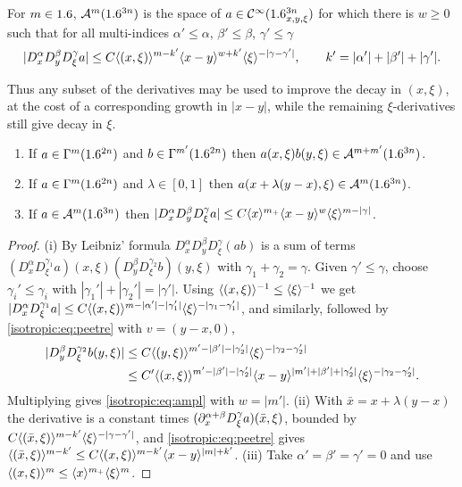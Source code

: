 \begin{definition}\label{isotropic:def:ampl}
For $m\in1.6$, $\mathcal{A}^{m}(1.6^{3n})$ is the space of $a\in\mathcal{C}^\infty(1.6^{3n}_{x,y,\xi})$
for which there is $w\ge0$ such that for all multi-indices
$\alpha'\le\alpha$, $\beta'\le\beta$, $\gamma'\le\gamma$
\begin{equation}\label{isotropic:eq:ampl}
  |D_x^\alpha D_y^\beta D_\xi^\gamma a|\le
  C\langle (x,\xi)\rangle^{m-k'}\langle x-y\rangle^{w+k'}\langle \xi\rangle^{-|\gamma-\gamma'|},\qquad k'=|\alpha'|+|\beta'|+|\gamma'| .
\end{equation}
\end{definition}

Thus any subset of the derivatives may be used to improve the decay in
$(x,\xi)$, at the cost of a corresponding growth in $|x-y|$, while the
remaining $\xi$-derivatives still give decay in $\xi$.

\begin{lemma}\label{isotropic:lem:ampl-examples}
\begin{enumerate}[label=\textup{(\roman*)}]
\item If $a\in\Gamma^{m}(1.6^{2n})$ and $b\in\Gamma^{m'}(1.6^{2n})$ then
  $a(x,\xi)b(y,\xi)\in\mathcal{A}^{m+m'}(1.6^{3n})$.
\item If $a\in\Gamma^{m}(1.6^{2n})$ and $\lambda\in[0,1]$ then
  $a(x+\lambda(y-x),\xi)\in\mathcal{A}^{m}(1.6^{3n})$.
\item If $a\in\mathcal{A}^{m}(1.6^{3n})$ then
  $|D_x^\alpha D_y^\beta D_\xi^\gamma a|\le C\langle x\rangle^{m_+}\langle x-y\rangle^w\langle \xi\rangle^{m-|\gamma|}$.
\end{enumerate}
\end{lemma}
\begin{proof}
(i) By Leibniz' formula $D_x^\alpha D_y^\beta D_\xi^\gamma(ab)$ is a sum of
terms $(D_x^\alpha D_\xi^{\gamma_1}a)(x,\xi)(D_y^\beta D_\xi^{\gamma_2}b)(y,\xi)$
with $\gamma_1+\gamma_2=\gamma$. Given $\gamma'\le\gamma$, choose $\gamma_i'\le\gamma_i$
with $|\gamma_1'|+|\gamma_2'|=|\gamma'|$. Using
$\langle (x,\xi)\rangle^{-1}\le\langle \xi\rangle^{-1}$ we get
$|D_x^\alpha D_\xi^{\gamma_1}a|\le C\langle (x,\xi)\rangle^{m-|\alpha'|-|\gamma_1'|}\langle \xi\rangle^{-|\gamma_1-\gamma_1'|}$,
and similarly, followed by \eqref{isotropic:eq:peetre} with $v=(y-x,0)$,
\begin{align*}
  |D_y^\beta D_\xi^{\gamma_2}b(y,\xi)|&\le C\langle (y,\xi)\rangle^{m'-|\beta'|-|\gamma_2'|}\langle \xi\rangle^{-|\gamma_2-\gamma_2'|}\\
  &\le C'\langle (x,\xi)\rangle^{m'-|\beta'|-|\gamma_2'|}\langle x-y\rangle^{|m'|+|\beta'|+|\gamma_2'|}\langle \xi\rangle^{-|\gamma_2-\gamma_2'|}.
\end{align*}
Multiplying gives \eqref{isotropic:eq:ampl} with $w=|m'|$. (ii) With
$\bar x=x+\lambda(y-x)$ the derivative is a constant times
$(\partial^{\alpha+\beta}_xD_\xi^\gamma a)(\bar x,\xi)$, bounded by
$C\langle (\bar x,\xi)\rangle^{m-k'}\langle \xi\rangle^{-|\gamma-\gamma'|}$, and
\eqref{isotropic:eq:peetre} gives
$\langle (\bar x,\xi)\rangle^{m-k'}\le C\langle (x,\xi)\rangle^{m-k'}\langle x-y\rangle^{|m|+k'}$.
(iii) Take $\alpha'=\beta'=\gamma'=0$ and use
$\langle (x,\xi)\rangle^m\le\langle x\rangle^{m_+}\langle \xi\rangle^m$.
\end{proof}

